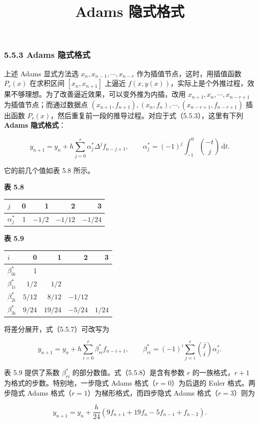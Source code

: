 \documentclass[
  10pt,
  fontset=fandol]{ctexart}
\title{Adams 隐式格式}
\author{}
\date{}
\newcounter{none} %
\begin{document}
\maketitle

\subsubsection{5.5.3 Adams 隐式格式}\label{adams-ux9690ux5f0fux683cux5f0f}

上述 Adams 显式方法选 \(x_n,x_{n-1},\cdots,x_{n-r}\) 作为插值节点，这时，用插值函数 \(P_r(x)\) 在求积区间 \([x_n,x_{n+1}]\) 上逼近 \(f(x,y(x))\)，实际上是个外推过程，效果不够理想。为了改善逼近效果，可以变外推为内插，改用 \(x_{n+1},x_n,\cdots,x_{n-r+1}\) 为插值节点；而通过数据点 \((x_{n+1},\allowbreak f_{n+1}),\allowbreak (x_n,\allowbreak f_n),\allowbreak \cdots,\allowbreak (x_{n-r+1},\allowbreak f_{n-r+1})\) 插出函数 \(P_r(x)\)，然后重复前一段的推导过程。对应于式（5.5.3），这里有下列 \textbf{Adams 隐式格式}：

\[
y_{n+1}=y_n+h\sum_{j=0}^r\alpha_j^*\Delta^j f_{n-j+1},\qquad
\alpha_j^*=(-1)^j\int_{-1}^0\binom{-t}{j}\,\mathrm dt.
\tag{5.5.7}
\]

它的前几个值如表 5.8 所示。

\textbf{表 5.8}

{\def\LTcaptype{none} %
\begin{longtable}[]{@{}lrrrr@{}}
\toprule\noalign{}
\(j\) & 0 & 1 & 2 & 3 \\
\midrule\noalign{}
\endhead
\bottomrule\noalign{}
\endlastfoot
\(\alpha_j^*\) & 1 & \(-1/2\) & \(-1/12\) & \(-1/24\) \\
\end{longtable}
}

\textbf{表 5.9}

{\def\LTcaptype{none} %
\begin{longtable}[]{@{}lrrrr@{}}
\toprule\noalign{}
\(i\) & 0 & 1 & 2 & 3 \\
\midrule\noalign{}
\endhead
\bottomrule\noalign{}
\endlastfoot
\(\beta_{0i}^*\) & 1 & & & \\
\(\beta_{1i}^*\) & \(1/2\) & \(1/2\) & & \\
\(\beta_{2i}^*\) & \(5/12\) & \(8/12\) & \(-1/12\) & \\
\(\beta_{3i}^*\) & \(9/24\) & \(19/24\) & \(-5/24\) & \(1/24\) \\
\end{longtable}
}

将差分展开，式（5.5.7）可改写为

\[
y_{n+1}=y_n+h\sum_{i=0}^r\beta_{ri}^*f_{n-i+1},\qquad
\beta_{ri}^*=(-1)^i\sum_{j=i}^r\binom ji\alpha_j^*.
\tag{5.5.8}
\]

表 5.9 提供了系数 \(\beta_{ri}^*\) 的部分数值。式（5.5.8）是含有参数 \(r\) 的一族格式，\(r+1\) 为格式的步数。特别地，一步隐式 Adams 格式（\(r=0\)）为后退的 Euler 格式。两步隐式 Adams 格式（\(r=1\)）为梯形格式，而四步隐式 Adams 格式（\(r=3\)）则为

\[
y_{n+1}=y_n+\frac h{24}(9f_{n+1}+19f_n-5f_{n-1}+f_{n-2}).
\tag{5.5.9}
\]
\end{document}
